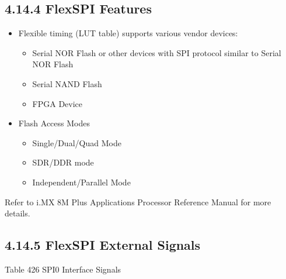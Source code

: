 \documentclass[letterpaper,10pt,openany,english]{sphinxmanual}
\begin{document}
\subsection{4.14.4 FlexSPI Features}
\label{\detokenize{hardware:flexspi-features}}\begin{itemize}
\item {} 
\sphinxAtStartPar
Flexible timing (LUT table) supports various vendor devices:
\begin{itemize}
\item {} 
\sphinxAtStartPar
Serial NOR Flash or other devices with SPI protocol similar to Serial NOR Flash

\item {} 
\sphinxAtStartPar
Serial NAND Flash

\item {} 
\sphinxAtStartPar
FPGA Device

\end{itemize}

\item {} 
\sphinxAtStartPar
Flash Access Modes
\begin{itemize}
\item {} 
\sphinxAtStartPar
Single/Dual/Quad Mode

\item {} 
\sphinxAtStartPar
SDR/DDR mode

\item {} 
\sphinxAtStartPar
Independent/Parallel Mode

\end{itemize}

\end{itemize}

\sphinxAtStartPar
Refer to i.MX 8M Plus Applications Processor Reference Manual for more details.


\subsection{4.14.5 FlexSPI External Signals}
\label{\detokenize{hardware:flexspi-external-signals}}
\sphinxAtStartPar
Table 4\sphinxhyphen{}26 SPI0 Interface Signals
\end{document}
